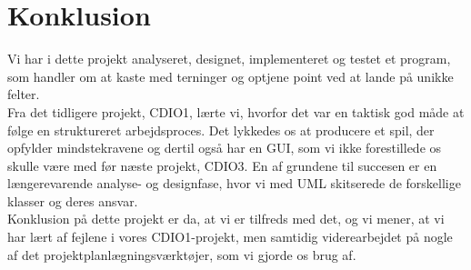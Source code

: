 \chapter{Konklusion}
Vi har i dette projekt analyseret, designet, implementeret og testet et program, som handler om at kaste med terninger og optjene point ved at lande på unikke felter.
\\
Fra det tidligere projekt, CDIO1, lærte vi, hvorfor det var en taktisk god måde at følge en struktureret arbejdsproces.
Det lykkedes os at producere et spil, der opfylder mindstekravene og dertil også har en GUI, som vi ikke forestillede os skulle være med før næste projekt, CDIO3.
En af grundene til succesen er en længerevarende analyse- og designfase, hvor vi med UML skitserede de forskellige klasser og deres ansvar.
\\
Konklusion på dette projekt er da, at vi er tilfreds med det, og vi mener, at vi har lært af fejlene i vores CDIO1-projekt, men samtidig viderearbejdet på nogle af det projektplanlægningsværktøjer, som vi gjorde os brug af.